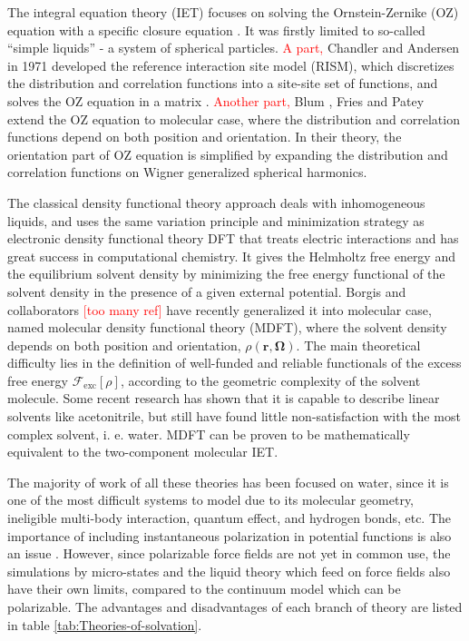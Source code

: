 The integral equation theory (\acs{IET}) focuses on solving the Ornstein-Zernike
(\acs{OZ}) equation with a specific closure equation \citep{Hensen-McDonald,Gray-Gubbins}.
It was firstly limited to so-called ``simple liquids'' - a system
of spherical particles. \textcolor{red}{A part,} Chandler and Andersen
in 1971 \citep{Chandler_1972_RISM} developed the reference interaction
site model (\acs{RISM}), which discretizes the distribution and correlation
functions into a site-site set of functions, and solves the \acs{OZ}
equation in a matrix \citep{hirata_molecular_2004}. \textcolor{red}{Another
part,} Blum \citep{Blum_I,Blum_II}, Fries and Patey \citep{Fries_Patey_1985}
extend the \acs{OZ} equation to molecular case, where the distribution
and correlation functions depend on both position and orientation.
In their theory, the orientation part of \acs{OZ} equation is simplified
by expanding the distribution and correlation functions on Wigner
generalized spherical harmonics.

The classical density functional theory approach deals with inhomogeneous
liquids, and uses the same variation principle and minimization strategy
\citep{mermin_thermal_1965,Evans_1979,Hansen_1987} as electronic
density functional theory \acs{DFT} that treats electric interactions
and has great success in computational chemistry. It gives the Helmholtz
free energy and the equilibrium solvent density by minimizing the
free energy functional of the solvent density in the presence of a
given external potential. Borgis and collaborators \textcolor{red}{{[}too
many ref{]}} have recently generalized it into molecular case, named
molecular density functional theory (\acs{MDFT}), where the solvent
density depends on both position and orientation, $\rho(\mathbf{r},\mathbf{\Omega})$.
The main theoretical difficulty lies in the definition of well-funded
and reliable functionals of the excess free energy $\mathcal{F}_{\mathrm{exc}}\left[\rho\right]$,
according to the geometric complexity of the solvent molecule. Some
recent research has shown that it is capable to describe linear solvents
like acetonitrile, but still have found little non-satisfaction with
the most complex solvent, i. e. water. \acs{MDFT} can be proven to
be mathematically equivalent to the two-component molecular \acs{IET}.

The majority of work of all these theories has been focused on water,
since it is one of the most difficult systems to model due to its
molecular geometry, ineligible multi-body interaction, quantum effect,
and hydrogen bonds, etc. The importance of including instantaneous
polarization in potential functions is also an issue \citep{polarisable_1,polarisable_2}.
However, since polarizable force fields are not yet in common use,
the simulations by micro-states and the liquid theory which feed on
force fields also have their own limits, compared to the continuum
model which can be polarizable. The advantages and disadvantages of
each branch of theory are listed in table \ref{tab:Theories-of-solvation}.

